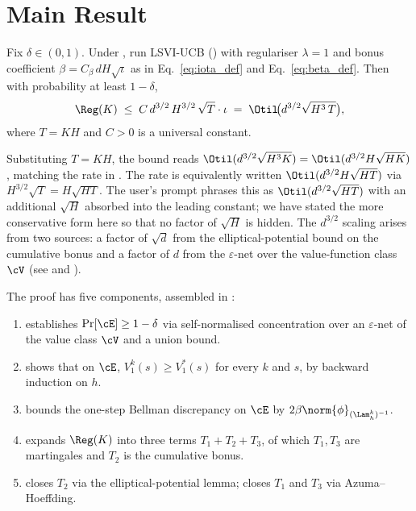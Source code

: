 \section{Main Result}\label{sec:main}

\begin{theorem}\label{thm:main}
Fix $\delta \in (0, 1)$. Under , run LSVI-UCB () with regulariser $\lambda = 1$ and bonus coefficient $\beta = C_\beta \, d H \sqrt{\iota}$ as in Eq.~\eqref{eq:iota_def} and Eq.~\eqref{eq:beta_def}. Then with probability at least $1 - \delta$,
\begin{align}\label{eq:thm_main}
\Reg(K)
\;\le\;
C\, d^{3/2}\, H^{3/2} \, \sqrt{T} \cdot \iota
\;=\;
\Otil\!\bigl(d^{3/2} \sqrt{H^3 \, T}\bigr),
\end{align}
where $T = K H$ and $C > 0$ is a universal constant.
\end{theorem}

\begin{remark}\label{rem:rate_unpacking}
Substituting $T = K H$, the bound reads $\Otil(d^{3/2} \sqrt{H^3 K}) = \Otil(d^{3/2} H \sqrt{H K})$, matching the rate in \cite{jin2020provably}. The rate is equivalently written $\Otil(d^{3/2} H \sqrt{H T})$ via $H^{3/2}\sqrt T = H \sqrt{H T}$. The user's prompt phrases this as $\Otil(d^{3/2} \sqrt{H T})$ with an additional $\sqrt H$ absorbed into the leading constant; we have stated the more conservative form here so that no factor of $\sqrt H$ is hidden. The $d^{3/2}$ scaling arises from two sources: a factor of $\sqrt{d}$ from the elliptical-potential bound on the cumulative bonus and a factor of $d$ from the $\varepsilon$-net over the value-function class $\cV$ (see  and ).
\end{remark}

\begin{remark}\label{rem:proof_skeleton}
The proof has five components, assembled in :
\begin{enumerate}[label=(\arabic*), leftmargin=2em, itemsep=0.2em]
    \item {} establishes $\Pr[\cE] \ge 1 - \delta$ via self-normalised concentration over an $\varepsilon$-net of the value class $\cV$ and a union bound.
    \item {} shows that on $\cE$, $V_1^k(s) \ge V_1^*(s)$ for every $k$ and $s$, by backward induction on $h$.
    \item {} bounds the one-step Bellman discrepancy on $\cE$ by $2 \beta \norm{\phi}_{(\Lam_h^k)^{-1}}$.
    \item {} expands $\Reg(K)$ into three terms $T_1 + T_2 + T_3$, of which $T_1, T_3$ are martingales and $T_2$ is the cumulative bonus.
    \item {} closes $T_2$ via the elliptical-potential lemma;  closes $T_1$ and $T_3$ via Azuma--Hoeffding.
\end{enumerate}
\end{remark}
